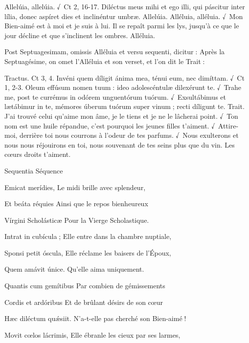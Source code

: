 \begin{paracol}{2}
Allelúia, allelúia. √~Ct 2, 16-17. Diléctus meus mihi et ego illi, qui páscitur inter lília, donec aspíret dies et inclinéntur umbræ. Allelúia.
\switchcolumn
Alléluia, alléluia. √~Mon Bien-aimé est à moi et je suis à lui. Il se repaît parmi les lys, jusqu’à ce que le jour décline et que s’inclinent les ombres. Alléluia.
\switchcolumn*

Post Septuagesimam, omissis Alléluia et versu sequenti, dicitur :
\switchcolumn
Après la Septuagésime, on omet l’Alléluia et son verset, et l’on dit le Trait :
\switchcolumn*

Tractus. Ct 3, 4. Invéni quem díligit ánima mea, ténui eum, nec dimíttam. √~Ct 1, 2-3. Oleum effúsum nomen tuum : ideo adolescéntulæ dilexérunt te. √~Trahe me, post te currémus in odórem unguentórum tuórum. √~Exsultábimus et lætábimur in te, mémores úberum tuórum super vinum ; recti díligunt te.
\switchcolumn
Trait. J’ai trouvé celui qu’aime mon âme, je le tiens et je ne le lâcherai point. √~Ton nom est une huile répandue, c’est pourquoi les jeunes filles t’aiment. √~Attire-moi, derrière toi nous courrons à l’odeur de tes parfums. √~Nous exulterons et nous nous réjouirons en toi, nous souvenant de tes seins plus que du vin. Les cœurs droits t’aiment.
\switchcolumn*

Sequentia
\switchcolumn
Séquence
\switchcolumn*

Emicat merídies,
\switchcolumn
Le midi brille avec splendeur,
\switchcolumn*

Et beáta réquies
\switchcolumn
Ainsi que le repos bienheureux
\switchcolumn*

Vírgini Scholásticæ
\switchcolumn
Pour la Vierge Scholastique.
\switchcolumn*

Intrat in cubícula ;
\switchcolumn
Elle entre dans la chambre nuptiale,
\switchcolumn*

Sponsi petit óscula,
\switchcolumn
Elle réclame les baisers de l’Époux,
\switchcolumn*

Quem amávit únice.
\switchcolumn
Qu’elle aima uniquement.
\switchcolumn*

Quantis cum gemítibus
\switchcolumn
Par combien de gémissements
\switchcolumn*

Cordis et ardóribus
\switchcolumn
Et de brûlant désirs de son cœur
\switchcolumn*

Hæc diléctum quǽsiit.
\switchcolumn
N’a-t-elle pas cherché son Bien-aimé !
\switchcolumn*

Movit cœlos lácrimis,
\switchcolumn
Elle ébranle les cieux par ses larmes,
\switchcolumn*


\end{paracol}
